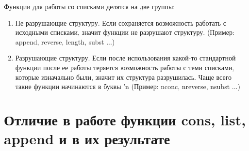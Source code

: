 \documentclass[a4paper,oneside,12pt]{extreport}
\begin{document}
Функции для работы со списками делятся на две группы:

\begin{enumerate}
	\item Не разрушающие структуру. Если сохраняется возможность работать с исходными списками, значит функции не разрушают структуру.
	(Пример: append, reverse, length, subst ...)
	\item Разрушающие структуру. 
	Если после использования какой-то стандартной функции после ее работы теряется 
	возможность работы с теми списками, которые изначально были, значит их структура разрушилась. 
	Чаще всего такие функции начинаются в буквы 'n (Пример: nconc, nreverse, nsubst ...)
\end{enumerate}

\section*{Отличие в работе функции cons, list, append и в их результате}
\end{document}
